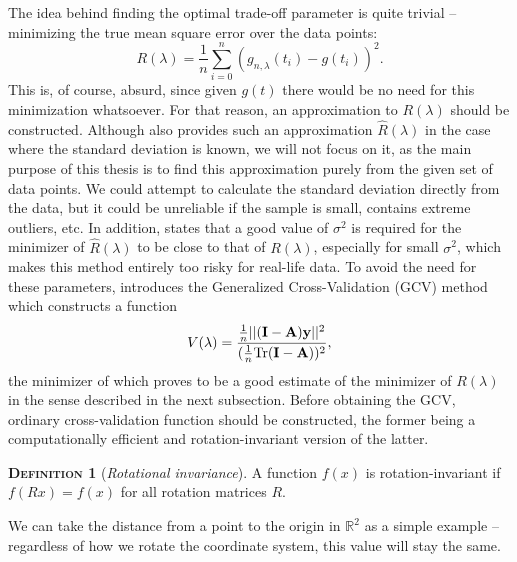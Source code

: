 \documentclass[11pt,leqno]{book}
\theoremstyle{definition}
\theoremstyle{plain}
\theoremstyle{definition}
\newtheorem{definition}[theorem]{\scshape{Definition}}
\begin{document}
{The idea behind finding the optimal trade-off parameter is quite trivial -- minimizing the true mean square error over the data points:
\begin{equation}
   R(\lambda) =  \frac{1}{n}\sum_{i=0}^n(g_{n,\lambda}(t_i)-g(t_i))^2.
\label{eq:true mse}
\end{equation}
This is, of course, absurd, since given $g(t)$ there would be no need for this minimization whatsoever. For that reason, an approximation to $R(\lambda)$ should be constructed. Although \cite{Craven1978} also provides such an approximation $\hat{R}(\lambda)$ in the case where the standard deviation is known, we will not focus on it, as the main purpose of this thesis is to find this approximation purely from the given set of data points. We could attempt to calculate the standard deviation directly from the data, but it could be unreliable if the sample is small, contains extreme outliers, etc. In addition, \cite{Craven1978} states that a good value of $\sigma^2$ is required for the minimizer of $\hat{R}({\lambda})$ to be close to that of $R(\lambda)$, especially for small $\sigma^2$, which makes this method entirely too risky for real-life data. To avoid the need for these parameters, \cite{Golub01051979} introduces the Generalized Cross-Validation (GCV) method which constructs a function 
\begin{equation}
V(\lambda)=\frac{\frac{1}{n}||(\vb{I}-\vb{A})\vb{y}||^2}{(\frac{1}{n}\text{Tr}(\vb{I}-\vb{A}))^2},
\label{eq:gcvv}
\end{equation}the minimizer of which proves to be a good estimate of the minimizer of $R(\lambda)$ in the sense described in the next subsection.
Before obtaining the GCV, ordinary cross-validation function should be constructed, the former being a computationally efficient and rotation-invariant version of the latter. 
\begin{definition}[\textit{Rotational invariance}]
A function $f(x)$ is rotation-invariant if $ f(R {x}) = f({x}) $ for all rotation matrices $ R $. 
\end{definition}
\noindent We can take the distance from a point to the origin in $\mathbb{R}^2$ as a simple example -- regardless of how we rotate the coordinate system, this value will stay the same.
}
\end{document}
